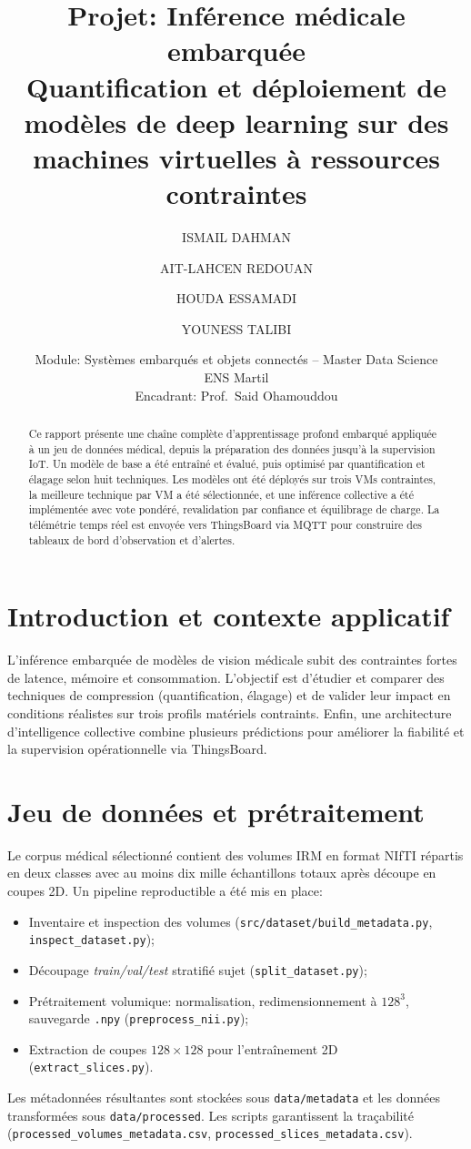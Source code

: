 \documentclass[11pt,a4paper]{article}
\title{Projet: Inférence médicale embarquée\\\large Quantification et déploiement de modèles de deep learning sur des machines virtuelles à ressources contraintes}
\author{ISMAIL DAHMAN \and AIT-LAHCEN REDOUAN \and HOUDA ESSAMADI \and YOUNESS TALIBI}
\date{Module: Systèmes embarqués et objets connectés – Master Data Science\\ENS Martil\\Encadrant: Prof.\ Said Ohamouddou}
\begin{document}
\maketitle

\begin{abstract}
Ce rapport présente une chaîne complète d'apprentissage profond embarqué appliquée à un jeu de données médical, depuis la préparation des données jusqu'à la supervision IoT. Un modèle de base a été entraîné et évalué, puis optimisé par quantification et élagage selon huit techniques. Les modèles ont été déployés sur trois VMs contraintes, la meilleure technique par VM a été sélectionnée, et une inférence collective a été implémentée avec vote pondéré, revalidation par confiance et équilibrage de charge. La télémétrie temps réel est envoyée vers ThingsBoard via MQTT pour construire des tableaux de bord d'observation et d'alertes.
\end{abstract}

\tableofcontents

\section{Introduction et contexte applicatif}
L'inférence embarquée de modèles de vision médicale subit des contraintes fortes de latence, mémoire et consommation. L'objectif est d'étudier et comparer des techniques de compression (quantification, élagage) et de valider leur impact en conditions réalistes sur trois profils matériels contraints. Enfin, une architecture d'intelligence collective combine plusieurs prédictions pour améliorer la fiabilité et la supervision opérationnelle via ThingsBoard.

\section{Jeu de données et prétraitement}
Le corpus médical sélectionné contient des volumes IRM en format NIfTI répartis en deux classes avec au moins dix mille échantillons totaux après découpe en coupes 2D. Un pipeline reproductible a été mis en place:
\begin{itemize}
  \item Inventaire et inspection des volumes (\texttt{src/dataset/build\_metadata.py}, \texttt{inspect\_dataset.py});
  \item Découpage \emph{train/val/test} stratifié sujet (\texttt{split\_dataset.py});
  \item Prétraitement volumique: normalisation, redimensionnement à \(128^3\), sauvegarde \texttt{.npy} (\texttt{preprocess\_nii.py});
  \item Extraction de coupes \(128\times 128\) pour l'entraînement 2D (\texttt{extract\_slices.py}).
\end{itemize}
Les métadonnées résultantes sont stockées sous \texttt{data/metadata} et les données transformées sous \texttt{data/processed}. Les scripts garantissent la traçabilité (\texttt{processed\_volumes\_metadata.csv}, \texttt{processed\_slices\_metadata.csv}).
\end{document}
